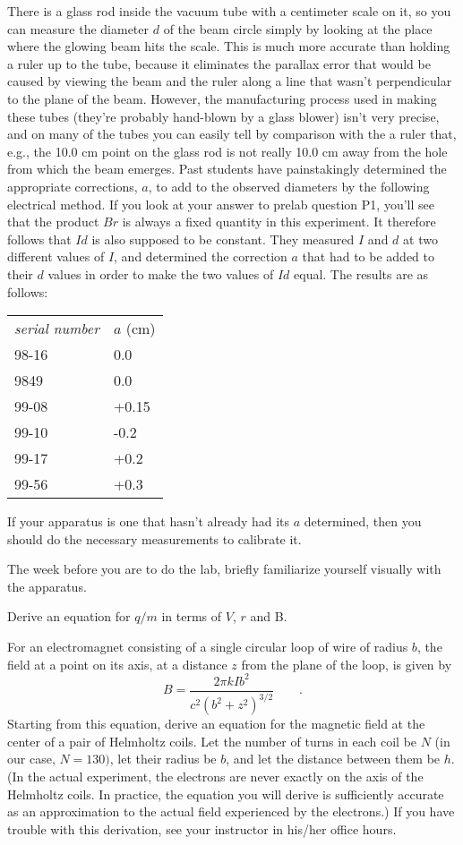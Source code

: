 There is a glass rod inside the vacuum tube
with a centimeter scale
on it, so you can measure the diameter $d$ of the beam circle
simply by looking at the place where the glowing beam hits
the scale. This is much more accurate than holding a ruler
up to the tube, because it eliminates the parallax error
that would be caused by viewing the beam and the ruler along
a line that wasn't perpendicular to the plane of the beam.
However, the manufacturing process used in making these tubes
(they're probably hand-blown by a glass blower) isn't very
precise, and on many of the tubes you can easily tell by comparison
with the a ruler that, e.g., the 10.0 cm point on the glass rod is
not really 10.0 cm away from the hole from which the beam emerges.
Past students have painstakingly determined the appropriate corrections, $a$,
to add to the observed diameters by the following electrical method.
If you look at your answer to prelab question P1, you'll see that the
product $Br$ is always a fixed quantity in this experiment. It therefore
follows that $Id$ is also supposed to be constant. They measured $I$ and $d$
at two different values of $I$, and determined the correction $a$ that had
to be added to their $d$ values in order to make the two values of $Id$
equal. The results are as follows:

\begin{tabular}{ll}
  \emph{serial number} & $a$ (cm) \\
  98-16 & 0.0 \\
  9849  & 0.0 \\
  99-08 & +0.15 \\
  99-10 & -0.2 \\
  99-17 & +0.2 \\
  99-56 & +0.3
\end{tabular}

If your apparatus is one that hasn't already had its $a$ determined, then
you should do the necessary measurements to calibrate it.

\prelab

The week before you are to do the lab, briefly familiarize
yourself visually with the apparatus.

\hvsafety


\prelabquestion  Derive an equation for $q/m$ in terms of $V$, $r$ and B.

\prelabquestion  For an electromagnet consisting of a single circular
loop of wire of radius $b$, the field at a point on its
axis, at a distance $z$ from the plane of the loop, is given by
\begin{equation*}
      B = \frac{2\pi kIb^2}{ c^2( b^2+ z^2)^{3/2}} \qquad .
\end{equation*}
Starting from this equation, derive an equation for the
magnetic field at the center of a pair of Helmholtz coils.
Let the number of turns in each coil be $N$ (in our case,
$N=130)$, let their radius be $b$, and let the distance
between them be $h$. (In the actual experiment, the
electrons are never exactly on the axis of the Helmholtz
coils. In practice, the equation you will derive is
sufficiently accurate as an approximation to the actual
field experienced by the electrons.) If you have trouble
with this derivation, see your instructor in his/her office hours.

